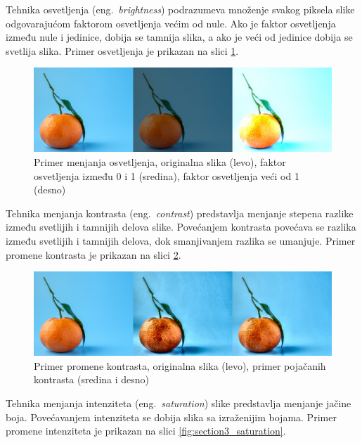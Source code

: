 \documentclass[12pt,oneside]{memoir}
\begin{document}
Tehnika osvetljenja (eng.~\textit{brightness}) podrazumeva množenje svakog piksela slike odgovarajućom faktorom osvetljenja većim od nule. Ako je faktor osvetljenja između nule i jedinice, dobija se tamnija slika, a ako je veći od jedinice dobija se svetlija slika. Primer osvetljenja je prikazan na slici \ref{fig:section3_brightness}.

\begin{figure}[ht]
    \centering
    \includegraphics[width=1\textwidth]{matfmaster/glava3/brightness.jpg}
    \caption{Primer menjanja osvetljenja, originalna slika (levo), faktor osvetljenja između 0 i 1 (sredina), faktor osvetljenja veći od 1 (desno) \cite{unsplashOrange}} 
    \label{fig:section3_brightness}
\end{figure}


Tehnika menjanja kontrasta (eng.~\textit{contrast}) predstavlja menjanje stepena razlike između svetlijih i tamnijih delova slike. Povećanjem kontrasta povećava se razlika između svetlijih i tamnijih delova, dok smanjivanjem razlika se umanjuje. Primer promene kontrasta je prikazan na slici \ref{fig:section3_contrast}.

\begin{figure}[ht]
    \centering
    \includegraphics[width=1\textwidth]{matfmaster/glava3/contrast.jpg}
    \caption{Primer promene kontrasta, originalna slika (levo), primer pojačanih kontrasta (sredina i desno) \cite{unsplashOrange}} 
    \label{fig:section3_contrast}
\end{figure}


Tehnika menjanja intenziteta (eng.~\textit{saturation}) slike predstavlja menjanje jačine boja. Povećavanjem intenziteta se dobija slika sa izraženijim bojama. Primer promene intenziteta je prikazan na slici \ref{fig:section3_saturation}.
\end{document}
